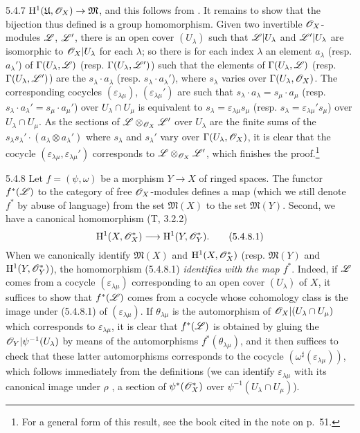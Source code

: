\begin{env}{5.4.7}
$\mathrm{H}^1(\mathfrak{U},\mathscr{O}_X)\to\mathfrak{M}$, and this follows from
. It remains to show that
the bijection thus defined is a group homomorphism. Given two invertible
$\mathscr{O}_X$-modules $\mathscr{L}$, $\mathscr{L}'$, there is an open cover $(U_\lambda)$ such
that $\mathscr{L}|U_\lambda$ and $\mathscr{L}'|U_\lambda$ are isomorphic to
$\mathscr{O}_X|U_\lambda$ for each $\lambda$; so there is for each index $\lambda$ an
element $a_\lambda$ (resp. $a_\lambda'$) of $\Gamma(U_\lambda,\mathscr{L})$
(resp. $\Gamma(U_\lambda,\mathscr{L}')$) such that the elements of
$\Gamma(U_\lambda,\mathscr{L})$ (resp. $\Gamma(U_\lambda,\mathscr{L}')$) are the
$s_\lambda\cdot a_\lambda$ (resp. $s_\lambda\cdot a_\lambda'$), where
$s_\lambda$ varies over $\Gamma(U_\lambda,\mathscr{O}_X)$. The corresponding cocycles
$(\varepsilon_{\lambda\mu})$, $(\varepsilon_{\lambda\mu}')$ are such that
$s_\lambda\cdot a_\lambda=s_\mu\cdot a_\mu$
(resp. $s_\lambda\cdot a_\lambda'=s_\mu\cdot a_\mu'$) over $U_\lambda\cap U_\mu$
is equivalent to $s_\lambda=\varepsilon_{\lambda\mu}s_\mu$
(resp. $s_\lambda=\varepsilon_{\lambda\mu}'s_\mu$) over $U_\lambda\cap U_\mu$.
As the sections of $\mathscr{L}\otimes_{\mathscr{O}_X}\mathscr{L}'$ over $U_\lambda$ are the
finite sums of the $s_\lambda s_\lambda'\cdot(a_\lambda\otimes a_\lambda')$
where $s_\lambda$ and $s_\lambda'$ vary over $\Gamma(U_\lambda,\mathscr{O}_X)$, it is
clear that the cocycle $(\varepsilon_{\lambda\mu},\varepsilon_{\lambda\mu}')$
corresponds to $\mathscr{L}\otimes_{\mathscr{O}_X}\mathscr{L}'$, which finishes the
proof.\footnote{For a general form of this result, see the book cited in the
note on p.~51.}
\end{env}

\begin{env}{5.4.8}
\label{env-0.5.4.8}
Let $f=(\psi,\omega)$ be a morphism $Y\to X$ of ringed spaces. The functor
$f^*(\mathscr{L})$ to the category of free $\mathscr{O}_X$-modules defines a map (which we
still denote $f^*$ by abuse of language) from the set $\mathfrak{M}(X)$ to the
set $\mathfrak{M}(Y)$. Second, we have a canonical homomorphism (T, 3.2.2)
\[
  \mathrm{H}^1(X,\mathscr{O}_X^*)\longrightarrow\mathrm{H}^1(Y,\mathscr{O}_Y^*).
  \tag{5.4.8.1}
\]
When we canonically identify  $\mathfrak{M}(X)$ and
$\mathrm{H}^1(X,\mathscr{O}_X^*)$ (resp. $\mathfrak{M}(Y)$ and $\mathrm{H}^1(Y,\mathscr{O}_Y^*)$), the
homomorphism (5.4.8.1) \emph{identifies with the map $f^*$}. Indeed, if $\mathscr{L}$
comes from a cocycle $(\varepsilon_{\lambda\mu})$ corresponding to an open cover
$(U_\lambda)$ of $X$, it suffices to show that $f^*(\mathscr{L})$ comes from a
cocycle whose cohomology class is the image under (5.4.8.1) of
$(\varepsilon_{\lambda\mu})$. If $\theta_{\lambda\mu}$ is the automorphism of
$\mathscr{O}_X|(U_\lambda\cap U_\mu)$ which corresponds to $\varepsilon_{\lambda\mu}$,
it is clear that $f^*(\mathscr{L})$ is obtained by gluing the
$\mathscr{O}_Y|\psi^{-1}(U_\lambda)$ by means of the automorphisms
$f^*(\theta_{\lambda\mu})$, and it then suffices to check that these latter
automorphisms corresponds to the cocycle
$(\omega^\sharp(\varepsilon_{\lambda\mu}))$, which follows immediately from the
definitions (we can identify $\varepsilon_{\lambda\mu}$ with its canonical image
under $\rho$ , a section of $\psi^*(\mathscr{O}_X^*)$ over
$\psi^{-1}(U_\lambda\cap U_\mu)$).
\end{env}

